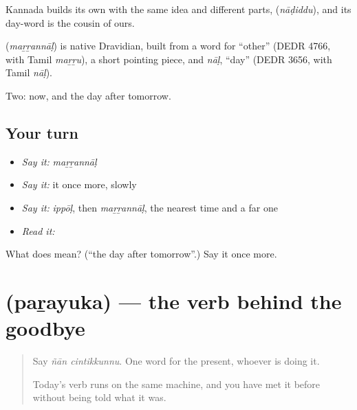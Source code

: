 Kannada builds its own with the same idea and different parts,  (\emph{nāḍiddu}), and its day-word is the cousin of ours.

\begin{cousinweb}
\textbf{} (\emph{maṟṟannāḷ}) is native Dravidian, built from a word for \textquotedblleft{}other\textquotedblright{} (DEDR 4766, with Tamil \emph{maṟṟu}), a short pointing piece, and \emph{nāḷ}, \textquotedblleft{}day\textquotedblright{} (DEDR 3656, with Tamil \emph{nāḷ}).
\end{cousinweb}

\begin{grammarlens}[title={What you've built}]
Two: now, and the day after tomorrow.
\end{grammarlens}

\subsection*{Your turn}
\begin{itemize}
\raggedright
  \item \emph{Say it:} \emph{maṟṟannāḷ}
  \item \emph{Say it:} it once more, slowly
  \item \emph{Say it:} \emph{ippōḷ}, then \emph{maṟṟannāḷ}, the nearest time and a far one
  \item \emph{Read it:} \textbf{}
\end{itemize}

\begin{tcolorbox}[breakable,colback=teal!4,colframe=teal!35!black,title={Before you move on}]
What does  mean? (\textquotedblleft{}the day after tomorrow\textquotedblright{}.) Say it once more.
\end{tcolorbox}
\section[\texorpdfstring{\ml{പറയുക} (paṟayuka)}{പറയുക (paṟayuka)}]{ (paṟayuka) — the verb behind the goodbye}

\label{lesson:ML-C50-parayuka}



\begin{quote}
Say \emph{ñān cintikkunnu}. One word for the present, whoever is doing it.

Today's verb runs on the same machine, and you have met it before without being told what it was.
\end{quote}

